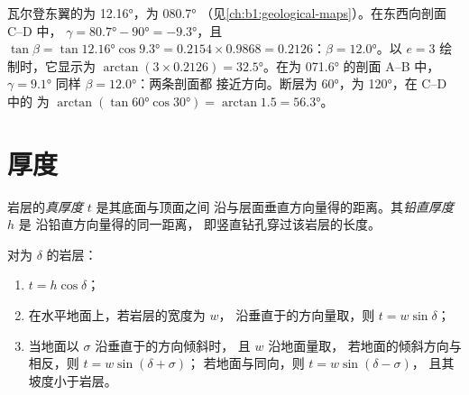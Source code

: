 \begin{example}
瓦尔登东翼的为 \ang{12.16}，为 \ang{080.7}
（见\cref{ch:b1:geological-maps}）。在东西向剖面 C--D 中，
$\gamma = \ang{80.7} - \ang{90} = \ang{-9.3}$，且 $\tan\beta =
\tan\ang{12.16}\cos\ang{9.3} = 0.2154\times0.9868 = 0.2126$：$\beta =
\ang{12.0}$。以 $e = 3$ 绘制时，它显示为 $\arctan(3\times0.2126) =
\ang{32.5}$。在为 \ang{071.6} 的剖面 A--B 中，$\gamma = \ang{9.1}$
同样 $\beta = \ang{12.0}$：两条剖面都
接近方向。断层为 \ang{60}，为 \ang{120}，在 C--D 中的
为 $\arctan(\tan\ang{60}\cos\ang{30}) = \arctan 1.5 = \ang{56.3}$。
\end{example}

\section{厚度}

\begin{definition}\label{def:b1:cross-sections:thickness}
岩层的\emph{真厚度} $t$ 是其底面与顶面之间
沿与层面垂直方向量得的距离。其\emph{铅直厚度} $h$ 是
沿铅直方向量得的同一距离，
即竖直钻孔穿过该岩层的长度。
\end{definition}

\begin{proposition}[倾斜岩层的厚度]\label{prop:b1:cross-sections:thickness}
对为 $\delta$ 的岩层：
\begin{enumerate}
  \item $t = h\cos\delta$；
  \item 在水平地面上，若岩层的宽度为 $w$，
        沿垂直于的方向量取，则 $t = w\sin\delta$；
  \item 当地面以 $\sigma$ 沿垂直于的方向倾斜时，
        且 $w$ 沿地面量取，
        若地面的倾斜方向与相反，则 $t = w\sin(\delta + \sigma)$；
        若地面与同向，则 $t = w\sin(\delta - \sigma)$，
        且其坡度小于岩层。
\end{enumerate}
\end{proposition}

